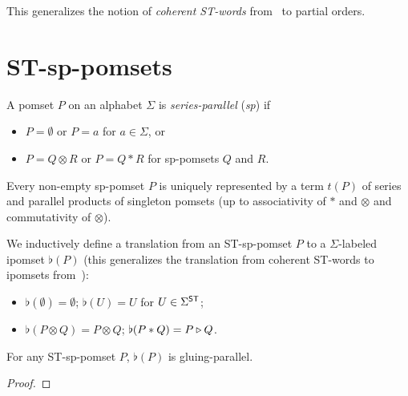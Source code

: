 \documentclass[a4paper,english]{lipics-v2021}
\begin{document}

This generalizes the notion of \emph{coherent ST-words}
from~\cite{conf/ramics/AmraneBCFZ24, DBLP:journals/corr/abs-2505-10461}
to partial orders.

\section{ST-sp-pomsets}


A pomset $P$ on an alphabet $\Sigma$ is \emph{series-parallel} (\emph{sp}) if
\begin{itemize}
\item $P=\emptyset$ or $P=a$ for $a\in \Sigma$, or
\item $P=Q\otimes R$ or $P=Q*R$ for sp-pomsets $Q$ and $R$.
\end{itemize}
Every non-empty sp-pomset $P$ is uniquely represented by a term $t(P)$ 
of series and parallel products of singleton pomsets
(up to associativity of $*$ and $\otimes$ and commutativity of $\otimes$).

We inductively define a translation from an ST-sp-pomset $P$ to a $\Sigma$-labeled ipomset $\flat(P)$
(this generalizes the translation from coherent ST-words to ipomsets
from~\cite{conf/ramics/AmraneBCFZ24, DBLP:journals/corr/abs-2505-10461}):
\begin{itemize}
\item $\flat(\emptyset)=\emptyset$; $\flat(U)=U$ for $U\in \Sigma^{\textup{\textsf{ST}}}$;
\item $\flat(P\otimes Q)=P\otimes Q$; $\flat(P*Q)=P\mathbin{\triangleright} Q$.
\end{itemize}



\begin{proposition}
  For any ST-sp-pomset $P$, $\flat(P)$ is gluing-parallel.
\end{proposition}

\begin{proof}
\end{proof}
\end{document}
